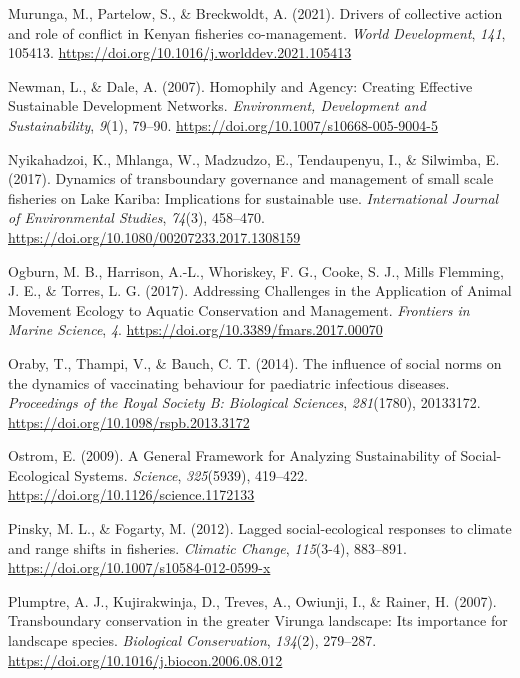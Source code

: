 \documentclass[
  12pt,
]{article}
\newlength{\cslhangindent}
\newenvironment{CSLReferences}[2] %
 {\begin{list}{}{%
  \setlength{\itemindent}{0pt}
  \setlength{\leftmargin}{0pt}
  \setlength{\parsep}{0pt}
  \ifodd #1
   \setlength{\leftmargin}{\cslhangindent}
   \setlength{\itemindent}{-1\cslhangindent}
  \fi
  \setlength{\itemsep}{#2\baselineskip}}}
 {\end{list}}
\begin{document}
\begin{CSLReferences}{1}{2}
Murunga, M., Partelow, S., \& Breckwoldt, A. (2021). Drivers of collective action and role of conflict in {Kenyan} fisheries co-management. \emph{World Development}, \emph{141}, 105413. \url{https://doi.org/10.1016/j.worlddev.2021.105413}

Newman, L., \& Dale, A. (2007). Homophily and {Agency}: {Creating Effective Sustainable Development Networks}. \emph{Environment, Development and Sustainability}, \emph{9}(1), 79--90. \url{https://doi.org/10.1007/s10668-005-9004-5}

Nyikahadzoi, K., Mhlanga, W., Madzudzo, E., Tendaupenyu, I., \& Silwimba, E. (2017). Dynamics of transboundary governance and management of small scale fisheries on {Lake Kariba}: Implications for sustainable use. \emph{International Journal of Environmental Studies}, \emph{74}(3), 458--470. \url{https://doi.org/10.1080/00207233.2017.1308159}

Ogburn, M. B., Harrison, A.-L., Whoriskey, F. G., Cooke, S. J., Mills Flemming, J. E., \& Torres, L. G. (2017). Addressing {Challenges} in the {Application} of {Animal Movement Ecology} to {Aquatic Conservation} and {Management}. \emph{Frontiers in Marine Science}, \emph{4}. \url{https://doi.org/10.3389/fmars.2017.00070}

Oraby, T., Thampi, V., \& Bauch, C. T. (2014). The influence of social norms on the dynamics of vaccinating behaviour for paediatric infectious diseases. \emph{Proceedings of the Royal Society B: Biological Sciences}, \emph{281}(1780), 20133172. \url{https://doi.org/10.1098/rspb.2013.3172}

Ostrom, E. (2009). A {General Framework} for {Analyzing Sustainability} of {Social-Ecological Systems}. \emph{Science}, \emph{325}(5939), 419--422. \url{https://doi.org/10.1126/science.1172133}

Pinsky, M. L., \& Fogarty, M. (2012). Lagged social-ecological responses to climate and range shifts in fisheries. \emph{Climatic Change}, \emph{115}(3-4), 883--891. \url{https://doi.org/10.1007/s10584-012-0599-x}

Plumptre, A. J., Kujirakwinja, D., Treves, A., Owiunji, I., \& Rainer, H. (2007). Transboundary conservation in the greater {Virunga} landscape: {Its} importance for landscape species. \emph{Biological Conservation}, \emph{134}(2), 279--287. \url{https://doi.org/10.1016/j.biocon.2006.08.012}


\end{CSLReferences}
\end{document}
